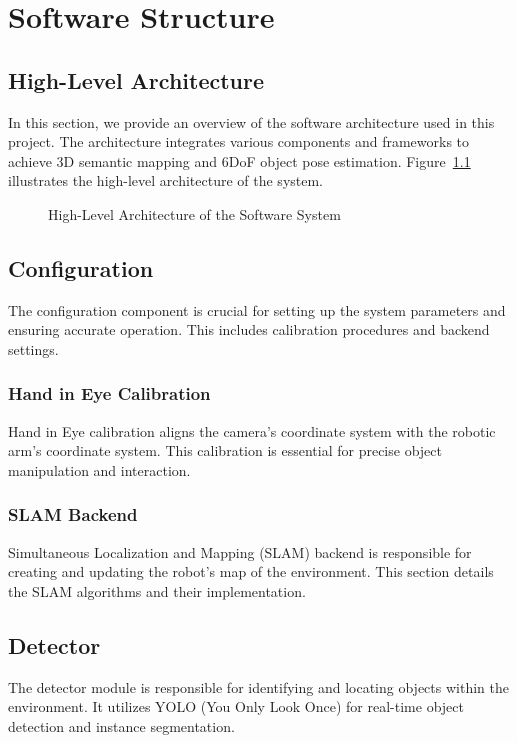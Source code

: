\chapter{Software Structure}

\section{High-Level Architecture}
In this section, we provide an overview of the software architecture used in this project. The architecture integrates various components and frameworks to achieve 3D semantic mapping and 6DoF object pose estimation. Figure~\ref{fig:architecture} illustrates the high-level architecture of the system.

\begin{figure}[h!]
    \centering
    \caption{High-Level Architecture of the Software System}
    \label{fig:architecture}
\end{figure}

\section{Configuration}
The configuration component is crucial for setting up the system parameters and ensuring accurate operation. This includes calibration procedures and backend settings.

\subsection{Hand in Eye Calibration}
Hand in Eye calibration aligns the camera's coordinate system with the robotic arm's coordinate system. This calibration is essential for precise object manipulation and interaction.

\subsection{SLAM Backend}
Simultaneous Localization and Mapping (SLAM) backend is responsible for creating and updating the robot's map of the environment. This section details the SLAM algorithms and their implementation.

\section{Detector}
The detector module is responsible for identifying and locating objects within the environment. It utilizes YOLO (You Only Look Once) for real-time object detection and instance segmentation.

